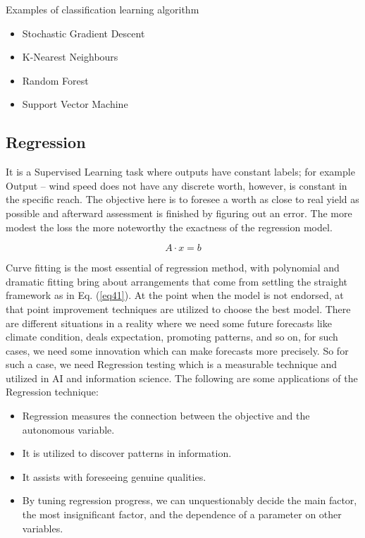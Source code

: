 Examples of classification learning algorithm
\begin{itemize}
    \item Stochastic Gradient Descent
    \item K-Nearest Neighbours
    \item Random Forest
    \item Support Vector Machine
\end{itemize}

\subsection{Regression}
It is a Supervised Learning task where outputs have constant labels; for example Output – wind speed does not have any discrete worth, however, is constant in the specific reach. The objective here is to foresee a worth as close to real yield as possible and afterward assessment is finished by figuring out an error. The more modest the loss the more noteworthy the exactness of the regression model. 

\begin{equation}
    \label{eq41}
    A \cdot x = b
\end{equation}

Curve fitting is the most essential of regression method, with polynomial and dramatic fitting bring about arrangements that come from settling the straight framework as in Eq. (\ref{eq41}). At the point when the model is not endorsed, at that point improvement techniques are utilized to choose the best model. There are different situations in a reality where we need some future forecasts like climate condition, deals expectation, promoting patterns, and so on, for such cases, we need some innovation which can make forecasts more precisely. So for such a case, we need Regression testing which is a measurable technique and utilized in AI and information science. The following are some applications of the Regression technique:

\begin{itemize}
    \item Regression measures the connection between the objective and the autonomous variable.
    \item It is utilized to discover patterns in information. 
    \item It assists with foreseeing genuine qualities.
    \item By tuning regression progress, we can unquestionably decide the main factor, the most insignificant factor, and the dependence of a parameter on other variables.
\end{itemize}

